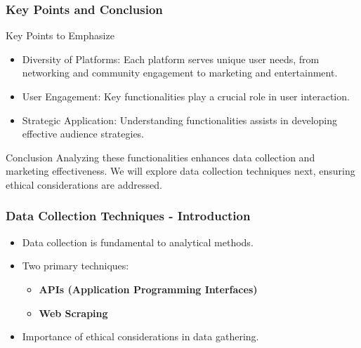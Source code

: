 \documentclass{beamer}
\begin{document}
\begin{frame}[fragile]
    \frametitle{Key Points and Conclusion}
    \begin{block}{Key Points to Emphasize}
        \begin{itemize}
            \item Diversity of Platforms: Each platform serves unique user needs, from networking and community engagement to marketing and entertainment.
            \item User Engagement: Key functionalities play a crucial role in user interaction.
            \item Strategic Application: Understanding functionalities assists in developing effective audience strategies.
        \end{itemize}
    \end{block}
    
    \begin{block}{Conclusion}
        Analyzing these functionalities enhances data collection and marketing effectiveness. We will explore data collection techniques next, ensuring ethical considerations are addressed.
    \end{block}
\end{frame}

\begin{frame}
    \frametitle{Data Collection Techniques - Introduction}
    \begin{itemize}
        \item Data collection is fundamental to analytical methods.
        \item Two primary techniques:
        \begin{itemize}
            \item \textbf{APIs (Application Programming Interfaces)}
            \item \textbf{Web Scraping}
        \end{itemize}
        \item Importance of ethical considerations in data gathering.
    \end{itemize}
\end{frame}
\end{document}
